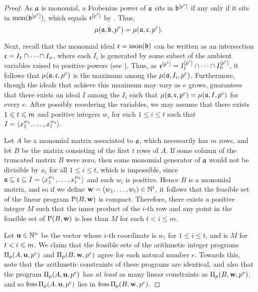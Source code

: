 \documentclass{amsart}
\begin{document}
\begin{proof}
As $\mathfrak{a}$ is monomial, a Frobenius power of $\mathfrak{a}$ sits in $\mathfrak{b}^{[p^e]}$ if any only if it sits in $\operatorname{mon}(\mathfrak{b}^{[p^e]})$, which equals
$\mathfrak{c}^{[p^e]}$ by .  Thus, \[\mu(\mathfrak{a}, \mathfrak{b}, p^e) = \mu(\mathfrak{a}, \mathfrak{c}, p^e).\]

Next, recall that the monomial ideal $\mathfrak{c} = \operatorname{mon}(\mathfrak{b})$ can be written as an intersection $\mathfrak{c} = I_1 \cap \cdots \cap I_n$, where each $I_i$ is generated by some subset of the ambient variables raised to positive powers (\eg see \cite[Lemma 5.18]{miller+sturmfels.combinatorial_CA}).  Thus, as $\mathfrak{c}^{[p^e]} = I_1^{[p^e]} \cap \cdots \cap I_n^{[p^e]}$, it follows that $\mu(\mathfrak{a}, \mathfrak{c}, p^e)$ is the maximum among the  $\mu(\mathfrak{a}, I_i, p^e)$.    Furthermore, though the ideals that achieve this maximum may vary as $e$ grows,  guarantees that there exists an ideal $I$ among the $I_i$ such that $\mu(\mathfrak{a}, \mathfrak{c}, p^e) = \mu(\mathfrak{a}, I, p^e)$ for every $e$.
After possibly reordering the variables,  we may assume that there exists $1 \leqslant t \leqslant m$ and positive integers $w_i$ for each $1 \leq i \leq t$ such that $I = \langle x_1^{w_1}, \ldots, x_t^{w_t} \rangle$.

Let $A$ be a monomial matrix associated to $\mathfrak{a}$, which necessarily has $m$ rows, and let $B$ be the matrix consisting of the first $t$ rows of $A$.  If some column of the truncated matrix $B$ were zero, then some monomial generator of $\mathfrak{a}$ would not be divisible by $x_i$  for all $1 \leq i \leq t$, which is impossible, since  $\mathfrak{a} \subseteq \mathfrak{c} \subseteq I = \langle x_1^{w_1}, \ldots, x_t^{w_t} \rangle$ and each $w_i$ is positive. Hence $B$ is a monomial matrix,  and so if we define $\mathbf{w} = (w_1, \ldots, w_t) \in \mathbb{N}^t$,   it follows that the feasible set of the linear program $\mathrm{P}(B, \mathbf{w})$ is compact.  Therefore, there exists a positive integer $M$ such that the inner product of the $i$-th row and any point in the feasible set of $\mathrm{P}(B, \mathbf{w})$ is less than $M$ for each $t < i \leq m$.

Let $\mathbf{u} \in \mathbb{N}^n$ be the vector whose $i$-th coordinate is $w_i$ for $1 \leq i \leq t$, and is $M$ for $t < i \leqslant m$.  We claim that the feasible sets of the arithmetic integer programs $\Pi_p(A,\mathbf{u},p^e)$ and $\Pi_p(B,\mathbf{w},p^e)$ agree for each natural number $e$.  Towards this,  note that the arithmetic constraints of these programs are identical, and also that the program $\Pi_p(A, \mathbf{u}, p^e)$  has \emph{at least} as many linear constraints as $\Pi_p(B, \mathbf{w},p^e)$, and so
$\operatorname{feas} \Pi_p(A, \mathbf{u}, p^e)$ lies in $\operatorname{feas} \Pi_p(B, \mathbf{w}, p^e)$.


\end{proof}
\end{document}
